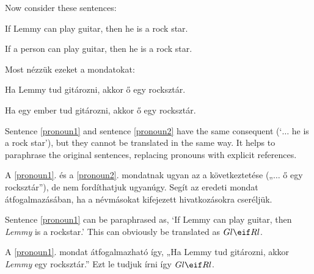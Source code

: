 Now consider these sentences:

\begin{earg}
\item[\ex{pronoun1}] If Lemmy can play guitar, then he is a rock star.
\item[\ex{pronoun2}] If a person can play guitar, then he is a rock star.
\end{earg}

Most nézzük ezeket a mondatokat:

\begin{earg}
\item[\ex{pronoun1}] Ha Lemmy tud gitározni, akkor ő egy rocksztár.
\item[\ex{pronoun2}] Ha egy ember tud gitározni, akkor ő egy rocksztár.
\end{earg}

Sentence \ref{pronoun1} and sentence \ref{pronoun2} have the same consequent (`$\ldots$ he is a rock star'), but they cannot be translated in the same way. It helps to paraphrase the original sentences, replacing pronouns with explicit references.

A \ref{pronoun1}. és a \ref{pronoun2}. mondatnak ugyan az a következtetése („$\ldots$ ő egy rocksztár”), de nem fordíthatjuk ugyanúgy. Segít az eredeti mondat átfogalmazásában, ha a névmásokat kifejezett hivatkozásokra cseréljük.

Sentence \ref{pronoun1} can be paraphrased as, `If Lemmy can play guitar, then \emph{Lemmy} is a rockstar.' This can obviously be translated as $Gl \eif Rl$.

A \ref{pronoun1}. mondat átfogalmazható így, „Ha Lemmy tud gitározni, akkor \emph{Lemmy} egy rocksztár.” Ezt le tudjuk írni így $Gl \eif Rl$.



